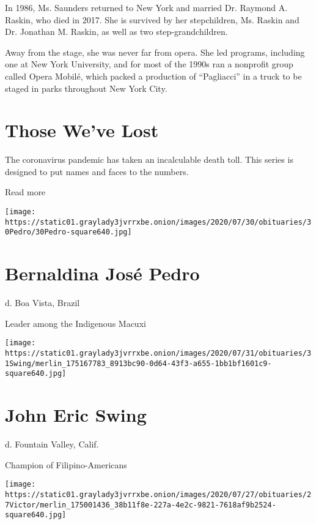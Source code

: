 In 1986, Ms. Saunders returned to New York and married Dr. Raymond A.
Raskin, who died in 2017. She is survived by her stepchildren, Ms.
Raskin and Dr. Jonathan M. Raskin, as well as two step-grandchildren.

Away from the stage, she was never far from opera. She led programs,
including one at New York University, and for most of the 1990s ran a
nonprofit group called Opera Mobilé, which packed a production of
``Pagliacci'' in a truck to be staged in parks throughout New York City.

\href{https://www.nytimes3xbfgragh.onion/interactive/2020/obituaries/people-died-coronavirus-obituaries.html?action=click\&pgtype=Article\&state=default\&region=BELOW_MAIN_CONTENT\&context=covid_obits_promo}{}

\hypertarget{those-weve-lost}{%
\section{Those We've Lost}\label{those-weve-lost}}

The coronavirus pandemic has taken an incalculable death toll. This
series is designed to put names and faces to the numbers.

Read more

\texttt{[image: https://static01.graylady3jvrrxbe.onion/images/2020/07/30/obituaries/30Pedro/30Pedro-square640.jpg]}

\hypertarget{bernaldina-josuxe9-pedro}{%
\section{Bernaldina José Pedro}\label{bernaldina-josuxe9-pedro}}

d. Boa Vista, Brazil

Leader among the Indigenous Macuxi

\texttt{[image: https://static01.graylady3jvrrxbe.onion/images/2020/07/31/obituaries/31Swing/merlin\_175167783\_8913bc90-0d64-43f3-a655-1bb1bf1601c9-square640.jpg]}

\hypertarget{john-eric-swing}{%
\section{John Eric Swing}\label{john-eric-swing}}

d. Fountain Valley, Calif.

Champion of Filipino-Americans

\texttt{[image: https://static01.graylady3jvrrxbe.onion/images/2020/07/27/obituaries/27Victor/merlin\_175001436\_38b11f8e-227a-4e2c-9821-7618af9b2524-square640.jpg]}

